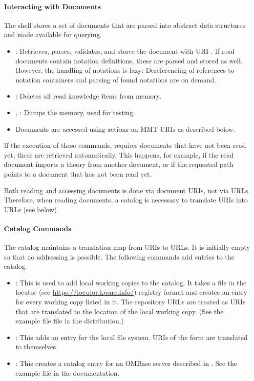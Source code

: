 \paragraph{Interacting with Documents}
The shell stores a set of documents that are parsed into abstract data structures and made available for querying.

\begin{itemize}
\item {}: Retrieves, parses, validates, and stores the document with URI . If read documents contain notation definitions, these are parsed and stored as well. However, the handling of notations is lazy: Dereferencing of references to notation containers and parsing of found notations are on demand.
\item {}: Deletes all read knowledge items from memory.
\item {}, : Dumps the memory, used for testing.
\item Documents are accessed using actions on MMT-URIs as described below.
\end{itemize}
If the execution of these commands, requires documents that have not been read yet, these are retrieved automatically. This happens, for example, if the read document imports a theory from another document, or if the requested path points to a document that has not been read yet.

Both reading and accessing documents is done via document URIs, not via URLs. Therefore, when reading documents, a catalog is necessary to translate URIs into URLs (see below).

\paragraph{Catalog Commands}
The catalog maintains a translation map from URIs to URLs. It is initially empty so that no addressing is possible. The following commands add entries to the catalog.

\begin{itemize}
\item {}: This is used to add local working copies to the catalog. It takes a file  in the locutor (see \url{https://locutor.kwarc.info/})  registry format and creates an entry for every working copy listed in it. The repository URLs are treated as URIs that are translated to the location of the local working copy. (See the example file  file in the distribution.)
\item {}: This adds an entry for the local file system. URIs of the form  are translated to themselves.
\item {}: This creates a catalog entry for an OMBase server described in . See the example file  in the documentation.
\end{itemize}

